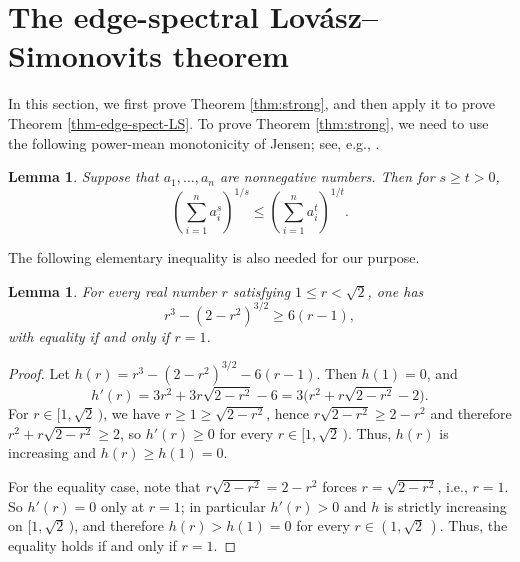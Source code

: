 \documentclass[10pt,a4paper]{amsart}
\newtheorem{lemma}[theorem]{Lemma}
\renewcommand{\leq}{\leqslant}
\renewcommand{\le}{\leqslant}
\renewcommand{\geq}{\geqslant}
\renewcommand{\ge}{\geqslant}
\begin{document}
\section{The edge-spectral Lov\'{a}sz--Simonovits theorem}

\label{sec:3}


In this section, we first prove Theorem \ref{thm:strong}, and then apply it to prove Theorem \ref{thm-edge-spect-LS}.  
To prove Theorem \ref{thm:strong}, we need to use the following power-mean monotonicity of Jensen; see, e.g., \cite{Beck1946}. 

\begin{lemma} \label{lem:Jensen}
Suppose that $a_1,\ldots ,a_n$ are nonnegative numbers. Then for $s\ge t>0$,  
\[ \left(\sum_{i=1}^n a_i^s \right)^{\!1/s} \le 
\left(\sum_{i=1}^n a_i^t \right)^{\!1/t} .  \] 
\end{lemma}

The following elementary inequality is also needed for our purpose. 



\begin{lemma}\label{lem:scalar}
For every real number $r$ satisfying
$ 1\leq r< \sqrt 2$, 
one has
\[
    r^3-(2-r^2)^{3/2}\geq 6(r-1),
\]
with equality if and only if $r=1$. 
\end{lemma}

\begin{proof}
Let $h(r)=r^3-(2-r^2)^{3/2}-6(r-1)$. Then $h(1)=0$, and
\[
    h'(r)=3r^2+3r\sqrt{2-r^2}-6=3\bigl(r^2+r\sqrt{2-r^2}-2\bigr).
\]
For $r\in[1,\sqrt2 \, )$, we have $r\ge1 \ge\sqrt{2-r^2}$, hence
$r\sqrt{2-r^2}\ge 2-r^2$ and therefore $r^2+r\sqrt{2-r^2}\ge 2$, so
$h'(r)\ge 0$ for every $r\in [1,\sqrt2 \, )$. Thus, $h(r)$ is increasing and $h(r)\ge h(1)=0$.

For the equality case, note that $r\sqrt{2-r^2}= 2-r^2$ forces $r=\sqrt{2-r^2}$, i.e., $r=1$. So $h'(r)=0$ only at
$r=1$; in particular $h'(r)>0$ and $h$ is
strictly increasing on $[1,\sqrt2\,)$, and therefore $h(r)>h(1)=0$ for every
$r\in(1,\sqrt2\,)$. Thus, the equality holds if and only if $r=1$. 
\end{proof}
\end{document}
